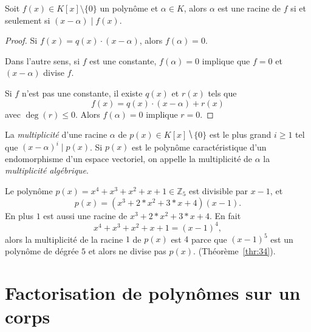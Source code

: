 \begin{theorem}
  \label{thr:35}
  Soit $f(x)∈ K[x] \setminus \{0\}$ un polynôme  et $\alpha \in K$, alors $\alpha$ est une racine de $f$ si et seulement si $(x- \alpha)  \mid f(x)$. 
\end{theorem}

\begin{proof}
  Si $f(x) = q(x) \cdot (x - \alpha)$, alors $f(\alpha) = 0$. 

Dans l'autre sens, si $f$ est une constante, $f(\alpha) = 0$ implique que $f = 0$ et $(x - \alpha)$ divise $f$. 

Si $f$ n'est pas une constante, il existe $q(x)$ et $r(x)$ tels que
\begin{displaymath}
  f(x) = q(x) \cdot (x - \alpha) + r(x)
\end{displaymath}
avec $\deg(r) \leq 0$. Alors $f(\alpha) = 0$ implique $r=0$. 
\end{proof}


\begin{definition}
  \label{def:41}
  La \emph{multiplicité} d'une racine $α$ de $p(x) ∈ K[x] ⧹\{0\}$ est le plus grand $i≥1$ tel que $ (x-α)^i \mid p(x)$. Si $p(x)$ est le polynôme caractéristique d'un endomorphisme d'un espace vectoriel, on appelle la multiplicité de $α$ la \emph{multiplicité algébrique}. 
\end{definition} 


\begin{example}  
  \label{exe:45}
  Le polynôme  $p(x) = x^4 + x^3 + x^2 + x + 1  ∈ℤ_5$  est divisible par $x-1$, et
  \begin{displaymath}
    p(x)  = (x^3 + 2*x^2 + 3*x + 4)  (x-1). 
  \end{displaymath}
  En plus $1$ est aussi une racine de $x^3 + 2*x^2 + 3*x + 4$. En fait 
  \begin{displaymath}
    x^4 + x^3 + x^2 + x + 1 = (x-1)^4,
  \end{displaymath}
  alors la multiplicité de la racine $1$ de $p(x)$ est $4$ parce que $(x-1)^5$ est un polynôme de dégrée $5$ et alors ne divise pas $p(x)$. (Théorème~\ref{thr:34}).   
\end{example}


\section{Factorisation de polynômes sur un corps}
\label{sec:fact-de-polyn}

